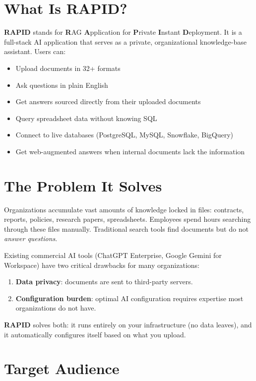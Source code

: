 \documentclass[12pt, a4paper, oneside]{report}
\newcommand{\rapidsys}{\textbf{\color{rapidblue}RAPID}}
\begin{document}
\section{What Is RAPID?}

\rapidsys{} stands for \textbf{R}AG \textbf{A}pplication for \textbf{P}rivate \textbf{I}nstant
\textbf{D}eployment. It is a full-stack AI application that serves as a private, organizational
knowledge-base assistant. Users can:

\begin{itemize}
  \item Upload documents in 32+ formats
  \item Ask questions in plain English
  \item Get answers sourced directly from their uploaded documents
  \item Query spreadsheet data without knowing SQL
  \item Connect to live databases (PostgreSQL, MySQL, Snowflake, BigQuery)
  \item Get web-augmented answers when internal documents lack the information
\end{itemize}

\section{The Problem It Solves}

Organizations accumulate vast amounts of knowledge locked in files: contracts, reports,
policies, research papers, spreadsheets. Employees spend hours searching through these files
manually. Traditional search tools find documents but do not \emph{answer questions}.

Existing commercial AI tools (ChatGPT Enterprise, Google Gemini for Workspace) have two
critical drawbacks for many organizations:
\begin{enumerate}
  \item \textbf{Data privacy}: documents are sent to third-party servers.
  \item \textbf{Configuration burden}: optimal AI configuration requires expertise most
        organizations do not have.
\end{enumerate}

\rapidsys{} solves both: it runs entirely on your infrastructure (no data leaves), and it
automatically configures itself based on what you upload.

\section{Target Audience}
\end{document}
